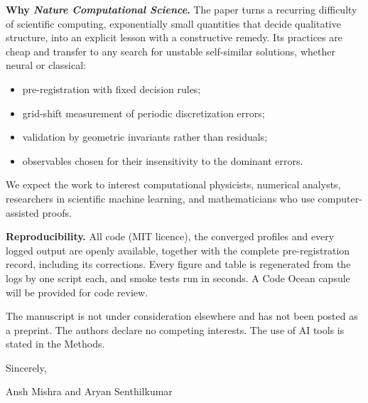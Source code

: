 \documentclass[11pt]{article}
\begin{document}
\textbf{Why \textit{Nature Computational Science}.} The paper turns a recurring difficulty of scientific computing,
exponentially small quantities that decide qualitative structure, into an explicit lesson with a constructive remedy.
Its practices are cheap and transfer to any search for unstable self-similar solutions, whether neural or classical:
\begin{itemize}
\item pre-registration with fixed decision rules;
\item grid-shift measurement of periodic discretization errors;
\item validation by geometric invariants rather than residuals;
\item observables chosen for their insensitivity to the dominant errors.
\end{itemize}
We expect the work to interest computational physicists, numerical analysts, researchers in scientific machine
learning, and mathematicians who use computer-assisted proofs.

\textbf{Reproducibility.} All code (MIT licence), the converged profiles and every logged output are openly available,
together with the complete pre-registration record, including its corrections. Every figure and table is regenerated
from the logs by one script each, and smoke tests run in seconds. A Code Ocean capsule will be provided for code
review.

The manuscript is not under consideration elsewhere and has not been posted as a preprint. The authors declare no
competing interests. The use of AI tools is stated in the Methods.

Sincerely,

Ansh Mishra and Aryan Senthilkumar
\end{document}
